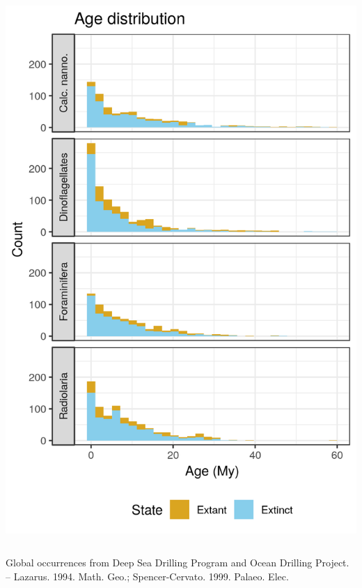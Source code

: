 \documentclass{beamer}
\begin{document}
\begin{frame}
\begin{columns}
\begin{column}{0.4\textwidth}
      \includegraphics[width=\textwidth,height=0.8\textheight,keepaspectratio=true]{../results/figure/age_label}
    \end{column}
  \end{columns}

  \footnotesize{Global occurrences from Deep Sea Drilling Program and Ocean Drilling Project. -- Lazarus. 1994. Math. Geo.; Spencer-Cervato. 1999. Palaeo. Elec.}

\end{frame}
\end{document}
